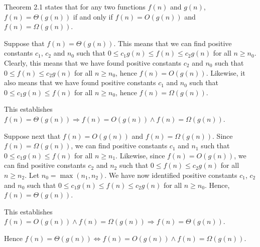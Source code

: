 \documentclass[a4paper,12pt]{article}
\begin{document}
\vspace{2mm}

Theorem 2.1 states that for any two functions $f(n)$ and $g(n)$, $f(n) = \Theta(g(n))$ if and only if $f(n) = O(g(n))$ and $f(n) = \Omega(g(n))$.

Suppose that $f(n) = \Theta(g(n))$. This means that we can find positive constants $c_1$, $c_2$ and $n_0$ such that $0 \le c_1g(n) \le f(n) \le c_2 g(n)$ for all $n \ge n_0$. Clearly, this means that we have found positive constants $c_2$ and $n_0$ such that $0 \le f(n) \le c_2g(n)$ for all $n \ge n_0$, hence $f(n) = O(g(n))$. Likewise, it also means that we have found positive constants $c_1$ and $n_0$ such that $0 \le c_1g(n) \le f(n)$ for all $n \ge n_0$, hence $f(n) = \Omega(g(n))$.

This establishes $f(n) = \Theta(g(n)) \Rightarrow f(n) = O(g(n)) \land f(n) = \Omega(g(n))$.

Suppose next that $f(n) = O(g(n))$ and $f(n) = \Omega(g(n))$. Since $f(n) = \Omega(g(n))$, we can find positive constants $c_1$ and $n_1$ such that $0 \le c_1g(n) \le f(n)$ for all $n \ge n_1$. Likewise, since $f(n) = O(g(n))$, we can find positive constants $c_2$ and $n_2$ such that $0 \le f(n) \le c_2g(n)$ for all $n \ge n_2$. Let $n_0 = \max(n_1, n_2)$. We have now identified positive constants $c_1$, $c_2$ and $n_0$ such that $0 \le c_1g(n) \le f(n) \le c_2g(n)$ for all $n \ge n_0$. Hence, $f(n) = \Theta(g(n))$.

This establishes $f(n) = O(g(n)) \land f(n) = \Omega(g(n)) \Rightarrow f(n) = \Theta(g(n))$.

Hence $f(n) = \Theta(g(n)) \iff f(n) = O(g(n)) \land f(n) = \Omega(g(n))$.

\vspace{2mm}
\end{document}
